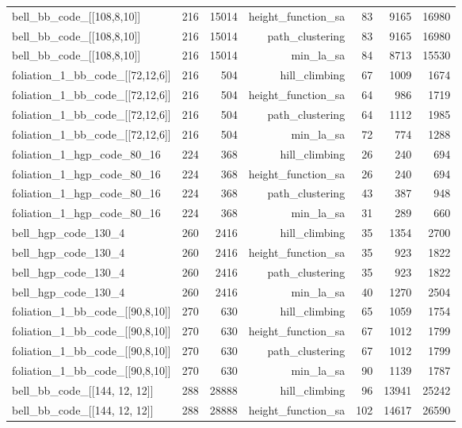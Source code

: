 \begin{longtable}{lrrrrrr}
  bell\_bb\_code\_[[108,8,10]] & 216 & 15014 & height\_function\_sa & 83 & 9165 & 16980 \\
  bell\_bb\_code\_[[108,8,10]] & 216 & 15014 & path\_clustering & 83 & 9165 & 16980 \\
  bell\_bb\_code\_[[108,8,10]] & 216 & 15014 & min\_la\_sa & 84 & 8713 & 15530 \\
  foliation\_1\_bb\_code\_[[72,12,6]] & 216 & 504 & hill\_climbing & 67 & 1009 & 1674 \\
  foliation\_1\_bb\_code\_[[72,12,6]] & 216 & 504 & height\_function\_sa & 64 & 986 & 1719 \\
  foliation\_1\_bb\_code\_[[72,12,6]] & 216 & 504 & path\_clustering & 64 & 1112 & 1985 \\
  foliation\_1\_bb\_code\_[[72,12,6]] & 216 & 504 & min\_la\_sa & 72 & 774 & 1288 \\
  foliation\_1\_hgp\_code\_80\_16 & 224 & 368 & hill\_climbing & 26 & 240 & 694 \\
  foliation\_1\_hgp\_code\_80\_16 & 224 & 368 & height\_function\_sa & 26 & 240 & 694 \\
  foliation\_1\_hgp\_code\_80\_16 & 224 & 368 & path\_clustering & 43 & 387 & 948 \\
  foliation\_1\_hgp\_code\_80\_16 & 224 & 368 & min\_la\_sa & 31 & 289 & 660 \\
  bell\_hgp\_code\_130\_4 & 260 & 2416 & hill\_climbing & 35 & 1354 & 2700 \\
  bell\_hgp\_code\_130\_4 & 260 & 2416 & height\_function\_sa & 35 & 923 & 1822 \\
  bell\_hgp\_code\_130\_4 & 260 & 2416 & path\_clustering & 35 & 923 & 1822 \\
  bell\_hgp\_code\_130\_4 & 260 & 2416 & min\_la\_sa & 40 & 1270 & 2504 \\
  foliation\_1\_bb\_code\_[[90,8,10]] & 270 & 630 & hill\_climbing & 65 & 1059 & 1754 \\
  foliation\_1\_bb\_code\_[[90,8,10]] & 270 & 630 & height\_function\_sa & 67 & 1012 & 1799 \\
  foliation\_1\_bb\_code\_[[90,8,10]] & 270 & 630 & path\_clustering & 67 & 1012 & 1799 \\
  foliation\_1\_bb\_code\_[[90,8,10]] & 270 & 630 & min\_la\_sa & 90 & 1139 & 1787 \\
  bell\_bb\_code\_[[144, 12, 12]] & 288 & 28888 & hill\_climbing & 96 & 13941 & 25242 \\
  bell\_bb\_code\_[[144, 12, 12]] & 288 & 28888 & height\_function\_sa & 102 & 14617 & 26590 \\

\end{longtable}
